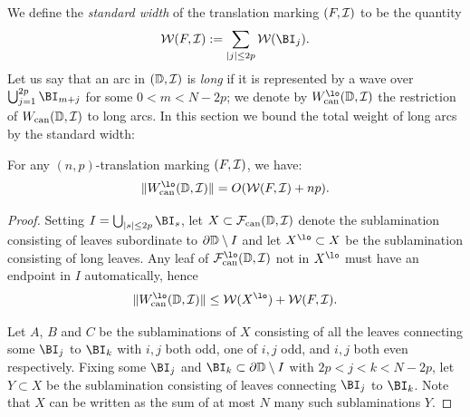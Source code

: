 \documentclass[12pt]{amsart}
\begin{document}
We define the  \textit{standard width}  of the translation marking $(F, \mathcal I)$ to be the quantity
$$\WW(F, \II): =\sum_{|j|\leq 2p}\WW(\BI_j).$$
Let us say that an arc in $(\mathbb D, \mathcal I)$ is \textit{long}  if it is represented by a wave over $\bigcup_{j=1}^{2p}\BI_{m+j}$ for some $0< m < N-2p$; we denote by $\wcan^\lo(\D, \II)$ the restriction of $W_{\operatorname{can}}(\mathbb D, \mathcal I)$ to long arcs. 
In this section we bound the total weight of long arcs by the standard width:
\begin{theorem}\label{thm:bounded short}
	For any $(n, p)$-translation marking $(F, \mathcal I)$, we have:
	$$\|\wcan^\lo(\D, \II)\|= O(\WW(F, \II)+np).$$
\end{theorem}

\begin{proof}
	Setting $I = \bigcup_{|s|\leq 2p}\BI_s$, let $X\subset \mathcal F_{\operatorname{can}}(\mathbb D, \mathcal I)$ denote the sublamination consisting of leaves subordinate to $\partial \mathbb D\setminus I$ and let $X^\lo\subset X$ be the sublamination consisting of long leaves.
	Any leaf of $\fcan^\lo(\D, \II)$ not in $X^\lo$ must have an endpoint in $I$ automatically,
	hence 
	\begin{equation}\label{eq:translation marking mostly long}
		\|\wcan^\lo(\D, \II)\|\leq \WW(X^\lo) + \WW(F, \II).
	\end{equation}
	
	Let $A$, $B$ and $C$ be the sublaminations of $X$ consisting of all the leaves connecting some $\BI_j$ to $\BI_k$ with 
	$i, j$ both odd, one of $i, j$ odd, and $i, j$ both even respectively.
	Fixing some $\BI_j$ and $\BI_k\subset \dD\sm I$ with $2p< j < k< N-2p$, let $Y\subset X$ be the sublamination consisting of leaves connecting $\BI_j$ to $\BI_k$.
	Note that $X$ can be written as the sum of at most $N$ many such sublaminations $Y$.


\end{proof}
\end{document}
